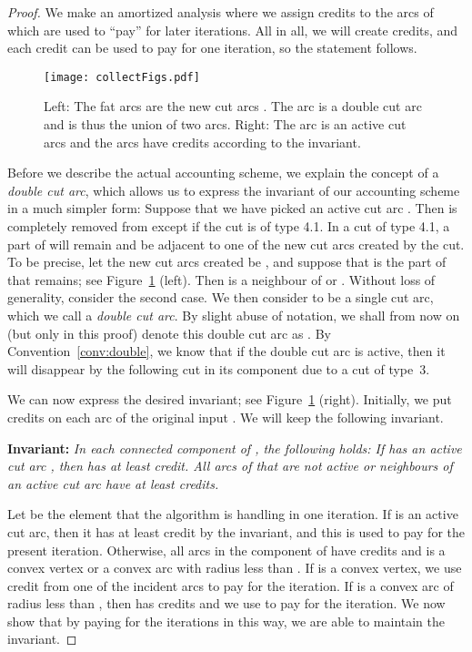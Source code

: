 \documentclass{article}
\begin{document}
\begin{proof}
We make an amortized analysis where we assign credits to the arcs of  which are used to ``pay'' for later iterations.
All in all, we will create  credits, and each credit can be used to pay for one iteration, so the statement follows.

\begin{figure}
\centering
\texttt{[image: collectFigs.pdf]}
\caption{Left: The fat arcs are the new cut arcs . The arc  is a double cut arc and is thus the union of two arcs.
Right: The arc  is an active cut arcs and the arcs have credits according to the invariant.}
\label{fig:doublecutarc}
\end{figure}

Before we describe the actual accounting scheme, we explain the concept of a \emph{double cut arc}, which allows us to express the invariant of our accounting scheme in a much simpler form:
Suppose that we have picked an active cut arc .
Then  is completely removed from  except if the cut is of type 4.1.
In a cut of type 4.1, a part of  will remain and be adjacent to one of the new cut arcs created by the cut.
To be precise, let the new cut arcs created be , and suppose that  is the part of  that remains; see Figure~\ref{fig:doublecutarc} (left).
Then  is a neighbour of  or .
Without loss of generality, consider the second case.
We then consider  to be a single cut arc, which we call a \emph{double cut arc}.
By slight abuse of notation, we shall from now on (but only in this proof) denote this double cut arc as .
By Convention~\ref{conv:double}, we know that if the double cut arc  is active, then it will disappear by the following cut in its component due to a cut of type~3.

We can now express the desired invariant; see Figure~\ref{fig:doublecutarc} (right).
Initially, we put  credits on each arc of the original input .
We will keep the following invariant. 

\textbf{Invariant:}
\emph{
In each connected component  of , the following holds:
If  has an active cut arc , then  has at least  credit.
All arcs of  that are not active or neighbours of an active cut arc have at least  credits.
}

Let  be the element 
that the algorithm is handling in one iteration.
If  is an active cut arc, then it has at least  credit by the invariant, and this is used to pay for the present iteration.
Otherwise, all arcs in the component of  have  credits and  is a convex vertex or a convex arc with radius less than .
If  is a convex vertex, we use  credit from one of the incident arcs to pay for the iteration.
If  is a convex arc of radius less than , then  has  credits and we use  to pay for the iteration.
We now show that by paying for the iterations in this way, we are able to maintain the invariant.


\end{proof}
\end{document}
